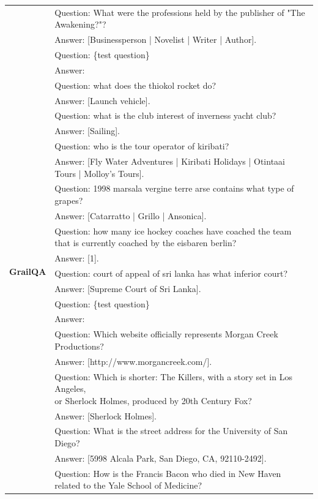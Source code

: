 \begin{table}[t]
\begin{tabular}{c | l}
    & Question: What were the professions held by the publisher of "The Awakening?"?\\
    & Answer: [Businessperson | Novelist | Writer | Author].\\
    & Question: \{test question\} \\
    & Answer:\\
    \midrule
    \multirow{20}{*}{\textbf{GrailQA}}  & Question: what does the thiokol rocket do? \\
    & Answer: [Launch vehicle].\\
    & Question: what is the club interest of inverness yacht club?\\
    & Answer: [Sailing].\\
    & Question: who is the tour operator of kiribati?\\
    & Answer: [Fly Water Adventures | Kiribati Holidays | Otintaai Tours | Molloy's Tours].\\
    & Question: 1998 marsala vergine terre arse contains what type of grapes?\\
    & Answer: [Catarratto | Grillo | Ansonica].\\
    & Question: \makecell[l]{how many ice hockey coaches have coached the team \\that is currently coached by the eisbaren berlin?}\\
    & Answer: [1].\\
    & Question: court of appeal of sri lanka has what inferior court?\\
    & Answer: [Supreme Court of Sri Lanka].\\
    & Question: \{test question\} \\
    & Answer:\\
    \midrule
    \multirow{20}{*}{\textbf{KQA Pro}}  & Question: Which website officially represents Morgan Creek Productions? \\
    & Answer: [http://www.morgancreek.com/].\\
    & Question: \makecell[l]{Which is shorter: The Killers, with a story set in Los Angeles, \\or Sherlock Holmes, produced by 20th Century Fox?}\\
    & Answer: [Sherlock Holmes].\\
    & Question: What is the street address for the University of San Diego?\\
    & Answer: [5998 Alcala Park, San Diego, CA, 92110-2492].\\
    & Question: How is the Francis Bacon who died in New Haven related to the Yale School of Medicine?\\

\end{tabular}
\end{table}
